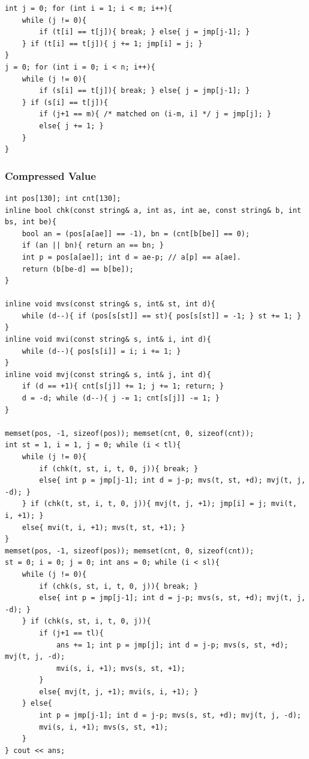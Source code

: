 \begin{verbatim}
int j = 0; for (int i = 1; i < m; i++){
	while (j != 0){
		if (t[i] == t[j]){ break; } else{ j = jmp[j-1]; }
	} if (t[i] == t[j]){ j += 1; jmp[i] = j; }
}
j = 0; for (int i = 0; i < n; i++){
	while (j != 0){
		if (s[i] == t[j]){ break; } else{ j = jmp[j-1]; } 
	} if (s[i] == t[j]){
		if (j+1 == m){ /* matched on (i-m, i] */ j = jmp[j]; }
		else{ j += 1; }
	}
}
\end{verbatim}

\subsubsection*{Compressed Value}
\begin{verbatim}
int pos[130]; int cnt[130];
inline bool chk(const string& a, int as, int ae, const string& b, int bs, int be){
	bool an = (pos[a[ae]] == -1), bn = (cnt[b[be]] == 0);
	if (an || bn){ return an == bn; }
	int p = pos[a[ae]]; int d = ae-p; // a[p] == a[ae].
	return (b[be-d] == b[be]);
}

inline void mvs(const string& s, int& st, int d){
	while (d--){ if (pos[s[st]] == st){ pos[s[st]] = -1; } st += 1; }
}
inline void mvi(const string& s, int& i, int d){
	while (d--){ pos[s[i]] = i; i += 1; }
}
inline void mvj(const string& s, int& j, int d){
	if (d == +1){ cnt[s[j]] += 1; j += 1; return; }
	d = -d; while (d--){ j -= 1; cnt[s[j]] -= 1; }
}

memset(pos, -1, sizeof(pos)); memset(cnt, 0, sizeof(cnt));
int st = 1, i = 1, j = 0; while (i < tl){
	while (j != 0){
		if (chk(t, st, i, t, 0, j)){ break; }
		else{ int p = jmp[j-1]; int d = j-p; mvs(t, st, +d); mvj(t, j, -d); }
	} if (chk(t, st, i, t, 0, j)){ mvj(t, j, +1); jmp[i] = j; mvi(t, i, +1); }
	else{ mvi(t, i, +1); mvs(t, st, +1); }
}
memset(pos, -1, sizeof(pos)); memset(cnt, 0, sizeof(cnt));
st = 0; i = 0; j = 0; int ans = 0; while (i < sl){
	while (j != 0){
		if (chk(s, st, i, t, 0, j)){ break; }
		else{ int p = jmp[j-1]; int d = j-p; mvs(s, st, +d); mvj(t, j, -d); }
	} if (chk(s, st, i, t, 0, j)){
		if (j+1 == tl){
			ans += 1; int p = jmp[j]; int d = j-p; mvs(s, st, +d); mvj(t, j, -d);
			mvi(s, i, +1); mvs(s, st, +1);
		}
		else{ mvj(t, j, +1); mvi(s, i, +1); }
	} else{
		int p = jmp[j-1]; int d = j-p; mvs(s, st, +d); mvj(t, j, -d);
		mvi(s, i, +1); mvs(s, st, +1);
	}
} cout << ans;
\end{verbatim}
